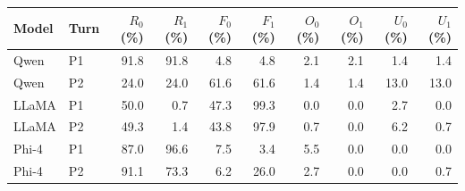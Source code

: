 \begin{tabular}{@{}llrrrrrrrr@{}}
\toprule
Model & Turn & $R_0$ (\%) & $R_1$ (\%) & $F_0$ (\%) & $F_1$ (\%) & $O_0$ (\%) & $O_1$ (\%) & $U_0$ (\%) & $U_1$ (\%) \\
\midrule
Qwen & P1 & 91.8 & 91.8 & 4.8 & 4.8 & 2.1 & 2.1 & 1.4 & 1.4 \\
Qwen & P2 & 24.0 & 24.0 & 61.6 & 61.6 & 1.4 & 1.4 & 13.0 & 13.0 \\
LLaMA & P1 & 50.0 & 0.7 & 47.3 & 99.3 & 0.0 & 0.0 & 2.7 & 0.0 \\
LLaMA & P2 & 49.3 & 1.4 & 43.8 & 97.9 & 0.7 & 0.0 & 6.2 & 0.7 \\
Phi-4 & P1 & 87.0 & 96.6 & 7.5 & 3.4 & 5.5 & 0.0 & 0.0 & 0.0 \\
Phi-4 & P2 & 91.1 & 73.3 & 6.2 & 26.0 & 2.7 & 0.0 & 0.0 & 0.7 \\
\bottomrule
\end{tabular}
